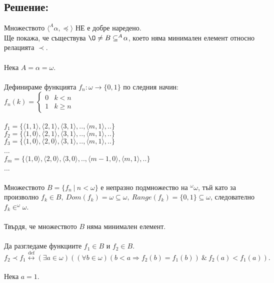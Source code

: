 \documentclass[french]{article}
\begin{document}
	\subsection*{Решение:}
	Множеството $\langle ^A\!\alpha, \preceq \rangle$ НЕ е добре наредено. \\
	Ще покажа, че съществува ${\O} \not= B \subseteq ^A\!\alpha$, което няма минимален елемент относно релацията $\prec$. \\
	\\
	Нека $A = \alpha = \omega$. \\
	\\
	Дефинираме функцията $f_n : \omega \to \{0,1\}$ по следния начин: \\
	$f_n(k) = 
	\begin{cases} 
		0 & k < n \\
		1 & k \ge n
	\end{cases}$
	\\ \\
	$f_1 = \{\langle 1,1 \rangle , \langle 2,1 \rangle , \langle 3,1 \rangle ,..,\langle m,1 \rangle ,..\}$ \\
	$f_2 = \{\langle 1,0 \rangle , \langle 2,1 \rangle , \langle 3,1 \rangle ,..,\langle m,1 \rangle ,..\}$ \\
	$f_3 = \{\langle 1,0 \rangle , \langle 2,0 \rangle , \langle 3,1 \rangle ,..,\langle m,1 \rangle ,..\}$ \\
	... \\
	$f_m = \{\langle 1,0 \rangle , \langle 2,0 \rangle , \langle 3,0 \rangle ,..,\langle m-1,0 \rangle , \langle m,1 \rangle,..\}$ \\
	... \\ \\
	Множеството $B = \{f_n\ |\ n < \omega\}$ е непразно подмножество на $^\omega\!\omega$, тъй като за произволно $f_k \in B,\ Dom(f_k) = \omega \subseteq \omega,\ Range(f_k) = \{0,1\} \subseteq \omega$, следователно $f_k \in ^\omega\!\omega$. \\
	\\
	Твърдя, че множеството $B$ няма минимален елемент. \\
	\\
	Да разгледаме функциите $f_1 \in B$ и $f_2 \in B$. \\
	$f_2 \prec f_1 \stackrel{\mathrm{def}}{\longleftrightarrow} (\exists a \in \omega)((\forall b \in \omega)(b < a \Rightarrow f_2(b) = f_1(b))\ \&\ f_2(a) < f_1(a)).$ \\
	\\
	Нека $a = 1$. \\
\end{document}
